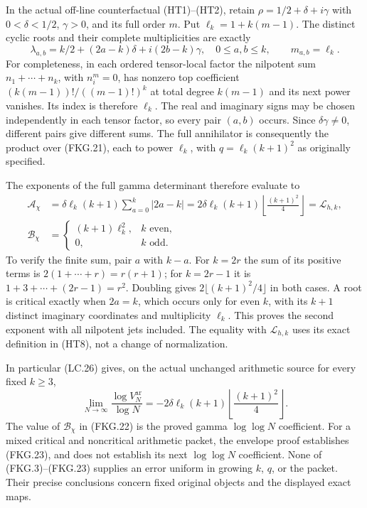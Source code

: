 In the actual off-line counterfactual (HT1)--(HT2), retain
$\rho=1/2+\delta+i\gamma$ with $0<\delta<1/2$, $\gamma>0$,
and its full order $m$. Put $\ell_k=1+k(m-1)$. The distinct
cyclic roots and their complete multiplicities are exactly
\[
 \lambda_{a,b}=k/2+(2a-k)\delta+i(2b-k)\gamma,
 \quad 0\leq a,b\leq k,\qquad m_{a,b}=\ell_k.
 \tag{FKG.21}
\]
For completeness, in each ordered tensor-local factor the nilpotent
sum $n_1+\cdots+n_k$, with $n_i^m=0$, has nonzero top coefficient
$(k(m-1))!/((m-1)!)^k$ at total degree $k(m-1)$ and its next
power vanishes. Its index is therefore $\ell_k$. The real and
imaginary signs may be chosen independently in each tensor factor,
so every pair $(a,b)$ occurs. Since $\delta\gamma\ne0$, different
pairs give different sums. The full annihilator is consequently
the product over (FKG.21), each to power $\ell_k$, with
$q=\ell_k(k+1)^2$ as originally specified.

The exponents of the full gamma determinant therefore evaluate to
\[
 \begin{aligned}
 \mathcal A_\chi
 &=\delta\ell_k(k+1)\sum_{a=0}^k|2a-k|
   =2\delta\ell_k(k+1)
              \left\lfloor\frac{(k+1)^2}{4}\right\rfloor
   =\mathcal L_{h,k},\\
 \mathcal B_\chi
 &=\begin{cases}(k+1)\ell_k^2,&k\text{ even},\\0,&k\text{ odd}.
   \end{cases}
 \end{aligned}
 \tag{FKG.22}
\]
To verify the finite sum, pair $a$ with $k-a$. For $k=2r$ the
sum of its positive terms is $2(1+\cdots+r)=r(r+1)$; for
$k=2r-1$ it is $1+3+\cdots+(2r-1)=r^2$. Doubling gives
$2\lfloor(k+1)^2/4\rfloor$ in both cases. A root is critical
exactly when $2a=k$, which occurs only for even $k$, with its
$k+1$ distinct imaginary coordinates and multiplicity $\ell_k$.
This proves the second exponent with all nilpotent jets included.
The equality with $\mathcal L_{h,k}$ uses its exact definition
in (HT8), not a change of normalization.

In particular (LC.26) gives, on the actual unchanged arithmetic
source for every fixed $k\geq3$,
\[
 \lim_{N\to\infty}\frac{\log V_N^{\mathrm{ar}}}{\log N}
 =-2\delta\ell_k(k+1)
              \left\lfloor\frac{(k+1)^2}{4}\right\rfloor.
 \tag{FKG.23}
\]
The value of $\mathcal B_\chi$ in (FKG.22) is the proved gamma
$\log\log N$ coefficient. For a mixed critical and noncritical
arithmetic packet, the envelope proof establishes (FKG.23), and
does not establish its next $\log\log N$ coefficient. None of
(FKG.3)--(FKG.23) supplies an error uniform in growing $k$, $q$,
or the packet. Their precise conclusions concern fixed original
objects and the displayed exact maps.

